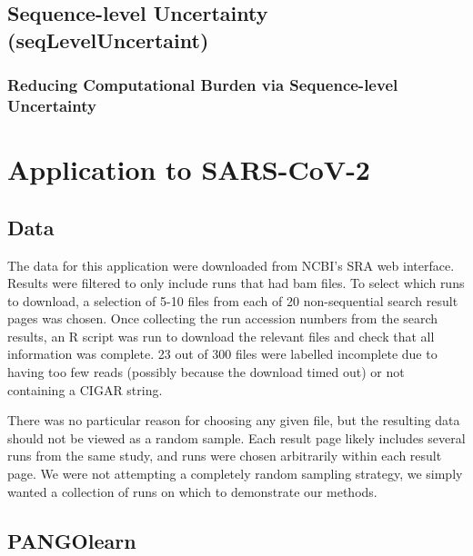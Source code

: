 \documentclass[]{article}
\begin{document}
\hypertarget{sequence-level-uncertainty-seqleveluncertaint}{%
\subsection{Sequence-level Uncertainty
(seqLevelUncertaint)}\label{sequence-level-uncertainty-seqleveluncertaint}}

\hypertarget{reducing-computational-burden-via-sequence-level-uncertainty}{%
\subsubsection{Reducing Computational Burden via Sequence-level
Uncertainty}\label{reducing-computational-burden-via-sequence-level-uncertainty}}

\hypertarget{application-to-sars-cov-2}{%
\section{Application to SARS-CoV-2}\label{application-to-sars-cov-2}}

\hypertarget{data}{%
\subsection{Data}\label{data}}

The data for this application were downloaded from NCBI's SRA web
interface. Results were filtered to only include runs that had bam
files. To select which runs to download, a selection of 5-10 files from
each of 20 non-sequential search result pages was chosen. Once
collecting the run accession numbers from the search results, an R
script was run to download the relevant files and check that all
information was complete. 23 out of 300 files were labelled incomplete
due to having too few reads (possibly because the download timed out) or
not containing a CIGAR string.

There was no particular reason for choosing any given file, but the
resulting data should not be viewed as a random sample. Each result page
likely includes several runs from the same study, and runs were chosen
arbitrarily within each result page. We were not attempting a completely
random sampling strategy, we simply wanted a collection of runs on which
to demonstrate our methods.

\hypertarget{pangolearn}{%
\subsection{PANGOlearn}\label{pangolearn}}
\end{document}
